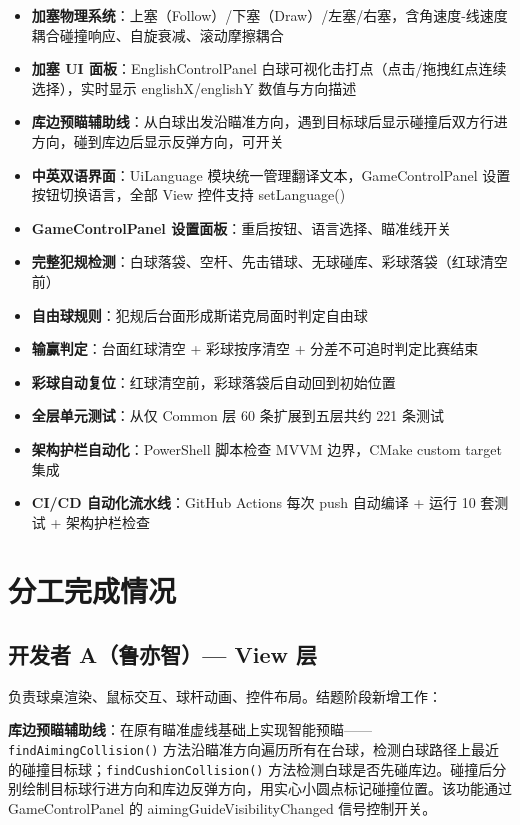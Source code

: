 \documentclass[11pt]{ctexart}
\begin{document}
\begin{itemize}
\item \textbf{加塞物理系统}：上塞（Follow）/下塞（Draw）/左塞/右塞，含角速度-线速度耦合碰撞响应、自旋衰减、滚动摩擦耦合
\item \textbf{加塞 UI 面板}：EnglishControlPanel 白球可视化击打点（点击/拖拽红点连续选择），实时显示 englishX/englishY 数值与方向描述
\item \textbf{库边预瞄辅助线}：从白球出发沿瞄准方向，遇到目标球后显示碰撞后双方行进方向，碰到库边后显示反弹方向，可开关
\item \textbf{中英双语界面}：UiLanguage 模块统一管理翻译文本，GameControlPanel 设置按钮切换语言，全部 View 控件支持 setLanguage()
\item \textbf{GameControlPanel 设置面板}：重启按钮、语言选择、瞄准线开关
\item \textbf{完整犯规检测}：白球落袋、空杆、先击错球、无球碰库、彩球落袋（红球清空前）
\item \textbf{自由球规则}：犯规后台面形成斯诺克局面时判定自由球
\item \textbf{输赢判定}：台面红球清空 + 彩球按序清空 + 分差不可追时判定比赛结束
\item \textbf{彩球自动复位}：红球清空前，彩球落袋后自动回到初始位置
\item \textbf{全层单元测试}：从仅 Common 层 60 条扩展到五层共约 221 条测试
\item \textbf{架构护栏自动化}：PowerShell 脚本检查 MVVM 边界，CMake custom target 集成
\item \textbf{CI/CD 自动化流水线}：GitHub Actions 每次 push 自动编译 + 运行 10 套测试 + 架构护栏检查
\end{itemize}

\section{分工完成情况}

\subsection{开发者 A（鲁亦智）— View 层}

负责球桌渲染、鼠标交互、球杆动画、控件布局。结题阶段新增工作：

\textbf{库边预瞄辅助线}：在原有瞄准虚线基础上实现智能预瞄——\texttt{findAimingCollision()} 方法沿瞄准方向遍历所有在台球，检测白球路径上最近的碰撞目标球；\texttt{findCushionCollision()} 方法检测白球是否先碰库边。碰撞后分别绘制目标球行进方向和库边反弹方向，用实心小圆点标记碰撞位置。该功能通过 GameControlPanel 的 aimingGuideVisibilityChanged 信号控制开关。
\end{document}
